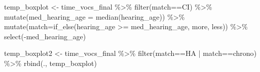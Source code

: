 \documentclass[
]{article}
\newenvironment{Shaded}{\begin{snugshade}}{\end{snugshade}}
\newcommand{\AttributeTok}[1]{\textcolor[rgb]{0.77,0.63,0.00}{#1}}
\newcommand{\FunctionTok}[1]{\textcolor[rgb]{0.00,0.00,0.00}{#1}}
\newcommand{\NormalTok}[1]{#1}
\newcommand{\OtherTok}[1]{\textcolor[rgb]{0.56,0.35,0.01}{#1}}
\newcommand{\SpecialCharTok}[1]{\textcolor[rgb]{0.00,0.00,0.00}{#1}}
\newcommand{\StringTok}[1]{\textcolor[rgb]{0.31,0.60,0.02}{#1}}
\begin{document}
\begin{Shaded}
\begin{Highlighting}[]
\NormalTok{temp\_boxplot }\OtherTok{\textless{}{-}}\NormalTok{ time\_vocs\_final }\SpecialCharTok{\%\textgreater{}\%} 
  \FunctionTok{filter}\NormalTok{(match}\SpecialCharTok{==}\StringTok{\textquotesingle{}CI\textquotesingle{}}\NormalTok{) }\SpecialCharTok{\%\textgreater{}\%}
  \FunctionTok{mutate}\NormalTok{(}\AttributeTok{med\_hearing\_age =} \FunctionTok{median}\NormalTok{(hearing\_age)) }\SpecialCharTok{\%\textgreater{}\%}
  \FunctionTok{mutate}\NormalTok{(}\AttributeTok{match=}\FunctionTok{if\_else}\NormalTok{(hearing\_age }\SpecialCharTok{\textgreater{}=}\NormalTok{ med\_hearing\_age, }\StringTok{\textquotesingle{}more\textquotesingle{}}\NormalTok{, }\StringTok{\textquotesingle{}less\textquotesingle{}}\NormalTok{)) }\SpecialCharTok{\%\textgreater{}\%}
  \FunctionTok{select}\NormalTok{(}\SpecialCharTok{{-}}\NormalTok{med\_hearing\_age)}

\NormalTok{temp\_boxplot2 }\OtherTok{\textless{}{-}}\NormalTok{ time\_vocs\_final }\SpecialCharTok{\%\textgreater{}\%}
  \FunctionTok{filter}\NormalTok{(match}\SpecialCharTok{==}\StringTok{\textquotesingle{}HA\textquotesingle{}} \SpecialCharTok{|}\NormalTok{ match}\SpecialCharTok{==}\StringTok{\textquotesingle{}chrono\textquotesingle{}}\NormalTok{) }\SpecialCharTok{\%\textgreater{}\%}
  \FunctionTok{rbind}\NormalTok{(., temp\_boxplot)}


\end{Highlighting}
\end{Shaded}
\end{document}
